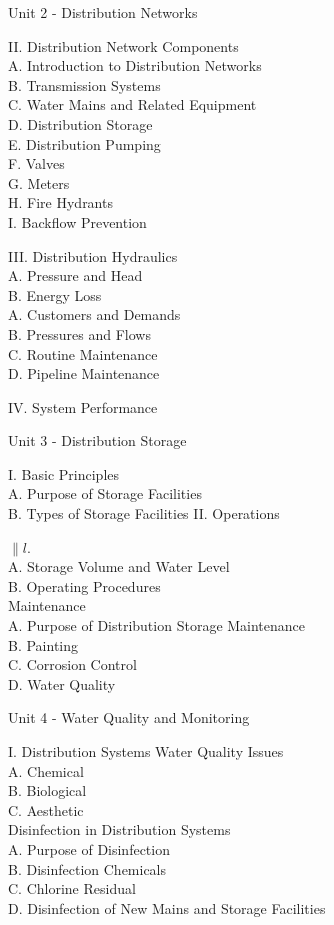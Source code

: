 \documentclass[10pt]{article}
\begin{document}
Unit 2 - Distribution Networks

II. Distribution Network Components\\
A. Introduction to Distribution Networks\\
B. Transmission Systems\\
C. Water Mains and Related Equipment\\
D. Distribution Storage\\
E. Distribution Pumping\\
F. Valves\\
G. Meters\\
H. Fire Hydrants\\
I. Backflow Prevention

III. Distribution Hydraulics\\
A. Pressure and Head\\
B. Energy Loss\\
A. Customers and Demands\\
B. Pressures and Flows\\
C. Routine Maintenance\\
D. Pipeline Maintenance

IV. System Performance

Unit 3 - Distribution Storage

I. Basic Principles\\
A. Purpose of Storage Facilities\\
B. Types of Storage Facilities II. Operations

$\| l$.\\
A. Storage Volume and Water Level\\
B. Operating Procedures\\
Maintenance\\
A. Purpose of Distribution Storage Maintenance\\
B. Painting\\
C. Corrosion Control\\
D. Water Quality

Unit 4 - Water Quality and Monitoring

I. Distribution Systems Water Quality Issues\\
A. Chemical\\
B. Biological\\
C. Aesthetic\\
Disinfection in Distribution Systems\\
A. Purpose of Disinfection\\
B. Disinfection Chemicals\\
C. Chlorine Residual\\
D. Disinfection of New Mains and Storage Facilities
\end{document}
